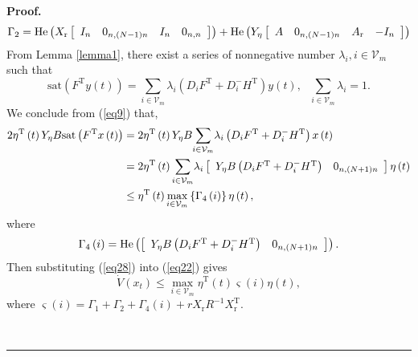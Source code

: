 \documentclass[9pt]{article}%
\newenvironment{proof}[1][Proof]{\noindent \textbf{#1.} }{\  \rule{0.5em}{0.5em}}
\begin{document}
\begin{proof}
\begin{equation}
\Gamma_{2}=\mathrm{He}\left(  X_{\mathrm{r}}\left[
\begin{array}
[c]{cccc}%
I_{n} & 0_{n,\left(  N-1\right)  n} & I_{n} & 0_{n,n}%
\end{array}
\right]  \right)  +\mathrm{He}\left(  Y_{\eta}\left[
\begin{array}
[c]{cccc}%
A & 0_{n,\left(  N-1\right)  n} & A_{\mathrm{r}} & -I_{n}%
\end{array}
\right]  \right)  \label{eq24}%
\end{equation}
From Lemma \ref{lemma1}, there exist a series of nonnegative number
$\lambda_{i},i\in \mathcal{V}_{m}$ such that $\  \ $\
\begin{equation}
\mathrm{sat}\left(  F^{\mathrm{T}}y\left(  t\right)  \right)  =\underset
{i\in \mathcal{V}_{m}}{\sum}\lambda_{i}\left(  D_{i}F^{\mathrm{T}}+D_{i}%
^{-}H^{\mathrm{T}}\right)  y\left(  t\right)  ,\text{ }\underset
{i\in \mathcal{V}_{m}}{\sum}\lambda_{i}=1. \label{eq9}%
\end{equation}
We conclude from (\ref{eq9}) that,
\begin{align}
2\eta^{\mathrm{T}}\left(  t\right)  Y_{\eta}B\mathrm{sat}\left(
F^{\mathrm{T}}x\left(  t\right)  \right)   &  =2\eta^{\mathrm{T}}\left(
t\right)  Y_{\eta}B\underset{i\in \mathcal{V}_{m}}{\sum}\lambda_{i}\left(
D_{i}F^{\mathrm{T}}+D_{i}^{-}H^{\mathrm{T}}\right)  x\left(  t\right)
\nonumber \\
&  =2\eta^{\mathrm{T}}\left(  t\right)  \underset{i\in \mathcal{V}_{m}}{\sum
}\lambda_{i}\left[
\begin{array}
[c]{cc}%
Y_{\eta}B\left(  D_{i}F^{\mathrm{T}}+D_{i}^{-}H^{\mathrm{T}}\right)  &
0_{n,\left(  N+1\right)  n}%
\end{array}
\right]  \eta \left(  t\right) \nonumber \\
&  \leq \eta^{\mathrm{T}}\left(  t\right)  \underset{i\in \mathcal{V}_{m}}{\max
}\left \{  \Gamma_{4}\left(  i\right)  \right \}  \eta \left(  t\right)  ,
\label{eq28}%
\end{align}
where%
\begin{equation}
\Gamma_{4}\left(  i\right)  =\mathrm{He}\left(  \left[
\begin{array}
[c]{cc}%
Y_{\eta}B\left(  D_{i}F^{\mathrm{T}}+D_{i}^{-}H^{\mathrm{T}}\right)  &
0_{n,\left(  N+1\right)  n}%
\end{array}
\right]  \right)  . \label{eq31}%
\end{equation}
Then substituting (\ref{eq28}) into (\ref{eq22}) gives%
\[
\dot{V}\left(  x_{t}\right)  \leq \underset{i\in \mathcal{V}_{m}}{\max}%
\eta^{\mathrm{T}}\left(  t\right)  \varsigma \left(  i\right)  \eta \left(
t\right)  ,
\]
where $\varsigma \left(  i\right)  =\Gamma_{1}+\Gamma_{2}+\Gamma_{4}\left(
i\right)  +rX_{\mathrm{r}}R^{-1}X_{\mathrm{r}}^{\mathrm{T}}.$


\end{proof}
\end{document}
